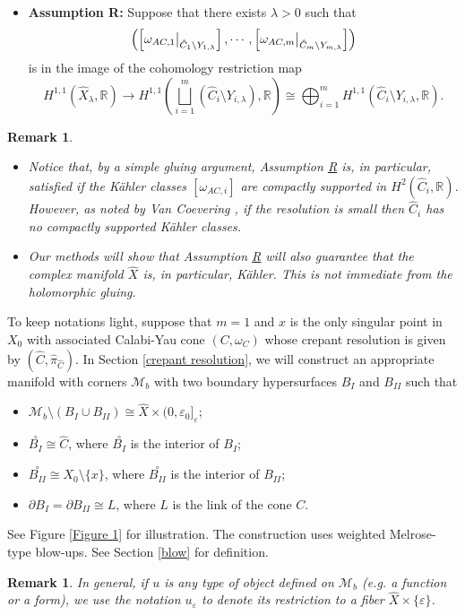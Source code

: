 \documentclass[a4paper,11pt]{article}
\newcounter{mythm}[section]
\newtheorem{rem}[mythm]{Remark}
\def\R{\mathbb{R}}
\newcommand\restr[2]{{%
  \left.\kern-\nulldelimiterspace %
  #1 %
  \littletaller %
  \right|_{#2} %
  }}
\newcommand{\littletaller}{\mathchoice{\vphantom{\big|}}{}{}{}}
\begin{document}
\begin{itemize}
    \item \textbf{Assumption \hypertarget{R}{R}:} Suppose that there exists $\lambda >0$ such that $$\left( \left[\restr{\omega_{AC,1}}{\hat C_1 \setminus Y_{1,\lambda}} \right], \cdots, \left[\restr{\omega_{AC,m}}{\hat C_m \setminus Y_{m,\lambda}} \right] \right)$$ is in the image of the cohomology restriction map $$ H^{1,1}(\hat X_\lambda, \R) \rightarrow H^{1,1} \left( \bigsqcup_{i=1}^m (\hat C_i \setminus Y_{i,\lambda}), \R \right) \cong \bigoplus_{i=1}^m H^{1,1} \left( \hat C_i \setminus Y_{i,\lambda}, \R \right). $$
\end{itemize}
\hfill
\begin{rem}
\hfill
    \begin{itemize}
        \item Notice that, by a simple gluing argument, Assumption \hyperlink{R}{R} is, in particular, satisfied if the Kähler classes $[\omega_{AC,i}]$ are compactly supported in $H^2(\hat C_i, \R)$. However, as noted by Van Coevering \cite{van_coevering_ricci-flat_2010}, if the resolution is small then $\hat C_i$ has no compactly supported Kähler classes. 
        \item Our methods will show that Assumption \hyperlink{R}{R} will also guarantee that the complex manifold $\hat X$ is, in particular, Kähler. This is not immediate from the holomorphic gluing. 
    \end{itemize}
\end{rem}
To keep notations light, suppose that $m=1$ and $x$ is the only singular point in $X_0$ with associated Calabi-Yau cone $(C, \omega_C)$ whose crepant resolution is given by $(\hat C, \hat \pi_{\hat C})$. In Section \ref{crepant resolution}, we will construct an appropriate manifold with corners $\mathcal{M}_b$ with two boundary hypersurfaces $B_{I}$ and $B_{II}$ such that 
\begin{itemize}
    \item $\mathcal{M}_b \setminus (B_I \cup B_{II}) \cong \hat X \times (0,\varepsilon_0]_\varepsilon$;
    \item $\overset{\circ}{B_I} \cong \hat{C}$, where $\overset{\circ}{B_I}$ is the interior of $B_I$;
    \item $\overset{\circ}{B_{II}} \cong X_0 \setminus \{ x\}$, where $\overset{\circ}{B_{II}}$ is the interior of $B_{II}$;
    \item $\partial B_I = \partial B_{II} \cong L$, where $L$ is the link of the cone $C$.
\end{itemize}
See Figure \ref{Figure 1} for illustration. The construction uses weighted Melrose-type blow-ups. See Section \ref{blow} for definition. 
\begin{rem}
In general, if $u$ is any type of object defined on $\mathcal{M}_b$ (e.g. a function or a form), we use the notation $u_\varepsilon$ to denote its restriction to a fiber $\hat{X} \times \{ \varepsilon \}$. 
\end{rem}
\end{document}
